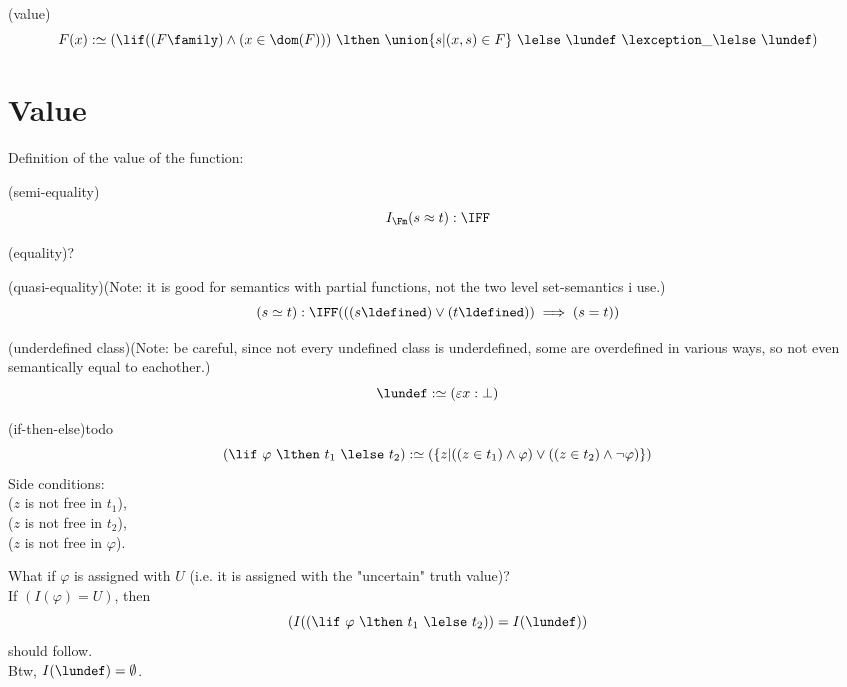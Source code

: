

\def\topic{Evaluation}

\begin{definition}(value)
\[
F(x) :\simeq \left(\lif ((F\family)\land(x \in \dom(F)))\ \lthen\ \union\{s|(x,s)\in F\}\ \lelse\ \lundef\ \lexception\_\lelse\ \lundef\right)
\]
\end{definition}

\section{Value} %
Definition of the value of the function:
\begin{definition}(semi-equality)
\[
I_\Fm(s\approx t) :\IFF 
\]
\end{definition}

\begin{definition}(equality)?
\end{definition}

\begin{definition}(quasi-equality)(Note: it is good for semantics with partial functions, not the two level set-semantics i use.)
\[
(s\simeq t) :\IFF (((s \ldefined)\lor(t \ldefined)) \implies (s=t))
\]
\end{definition}

\begin{definition}(underdefined class)(Note: be careful, since not every undefined class is underdefined, some are overdefined in various ways, so not even semantically equal to eachother.)
\[
\lundef :\simeq (\varepsilon x: \bot)
\]
\end{definition}

\begin{definition}(if-then-else)todo
\[
(\lif\ \varphi\ \lthen\ t_1\ \lelse\ t_2) :\simeq (\{z|((z\in t_1)\land\varphi)\lor((z\in t_2)\land\neg\varphi)\})
\]
Side conditions:\\
($z$ is not free in $t_1$),\\
($z$ is not free in $t_2$),\\
($z$ is not free in $\varphi$).\\
\end{definition}
What if $\varphi$ is assigned with $U$ (i.e. it is assigned with the "uncertain" truth value)?\\
If $(I(\varphi)=U)$, then 
\[
(I((\lif\ \varphi\ \lthen\ t_1\ \lelse\ t_2))=I(\lundef))
\]
should follow.\\
Btw, $I(\lundef)=\emptyset$.\\

